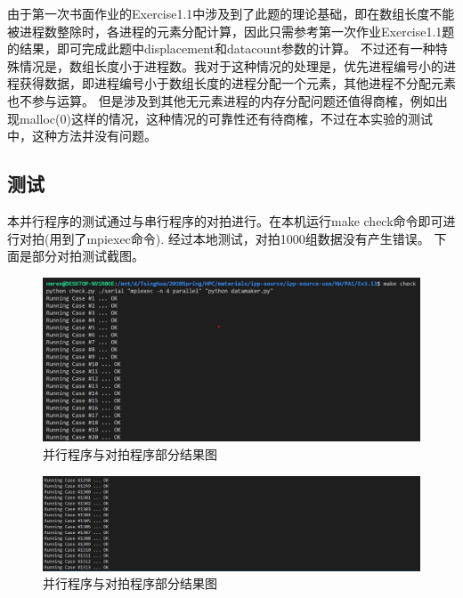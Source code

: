 \documentclass[UTF8]{article}
\begin{document}
由于第一次书面作业的Exercise1.1中涉及到了此题的理论基础，即在数组长度不能被进程数整除时，各进程的元素分配计算，因此只需参考第一次作业Exercise1.1题的结果，即可完成此题中displacement和datacount参数的计算。
不过还有一种特殊情况是，数组长度小于进程数。我对于这种情况的处理是，优先进程编号小的进程获得数据，即进程编号小于数组长度的进程分配一个元素，其他进程不分配元素也不参与运算。
但是涉及到其他无元素进程的内存分配问题还值得商榷，例如出现malloc(0)这样的情况，这种情况的可靠性还有待商榷，不过在本实验的测试中，这种方法并没有问题。

\subsection{测试}
本并行程序的测试通过与串行程序的对拍进行。在本机运行make check命令即可进行对拍(用到了mpiexec命令). 经过本地测试，对拍1000组数据没有产生错误。
下面是部分对拍测试截图。

\begin{figure}[h]
    \centering
    \includegraphics[width=\textwidth]{checkResult.png}
    \caption{并行程序与对拍程序部分结果图}
\end{figure}

\begin{figure}[h]
    \centering
    \includegraphics[width=\textwidth]{checkResult1.png}
    \caption{并行程序与对拍程序部分结果图}
\end{figure}


\newpage

\end{document}
